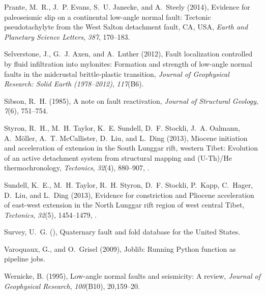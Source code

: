 \documentclass[draft,grl]{AGUTeX}
\begin{document}
\begin{article}
\begin{thebibliography}{46}
Prante, M.~R., J.~P. Evans, S.~U. Janecke, and A.~Steely (2014), Evidence for
  paleoseismic slip on a continental low-angle normal fault: {T}ectonic
  pseudotachylyte from the {W}est {S}alton detachment fault, {CA}, {U}{S}{A},
  \textit{Earth and Planetary Science Letters}, \textit{387}, 170--183.

Selverstone, J., G.~J. Axen, and A.~Luther (2012), Fault localization
  controlled by fluid infiltration into mylonites: {F}ormation and strength of
  low-angle normal faults in the midcrustal brittle-plastic transition,
  \textit{Journal of Geophysical Research: Solid Earth (1978--2012)},
  \textit{117}(B6).

Sibson, R.~H. (1985), A note on fault reactivation, \textit{Journal of
  Structural Geology}, \textit{7}(6), 751--754.

Styron, R.~H., M.~H. Taylor, K.~E. Sundell, D.~F. Stockli, J.~A. Oalmann,
  A.~M{\"o}ller, A.~T. McCallister, D.~Liu, and L.~Ding (2013), Miocene
  initiation and acceleration of extension in the {S}outh {L}unggar rift,
  western {T}ibet: Evolution of an active detachment system from structural
  mapping and ({U}-{T}h)/{H}e thermochronology, \textit{Tectonics},
  \textit{32}(4), 880--907, .

Sundell, K.~E., M.~H. Taylor, R.~H. Styron, D.~F. Stockli, P.~Kapp, C.~Hager,
  D.~Liu, and L.~Ding (2013), Evidence for constriction and {P}liocene
  acceleration of east-west extension in the {North Lunggar} rift region of
  west central {T}ibet, \textit{Tectonics}, \textit{32}(5), 1454--1479,
  .

Survey, U.~G. (), {Q}uaternary fault and fold database for the {U}nited
  {S}tates.

Varoquaux, G., and O.~Grisel (2009), {J}oblib: {R}unning {P}ython function as
  pipeline jobs.

Wernicke, B. (1995), Low-angle normal faults and seismicity: A review,
  \textit{Journal of Geophysical Research}, \textit{100}(B10), 20,159--20.


\end{thebibliography}
\end{article}
\end{document}
